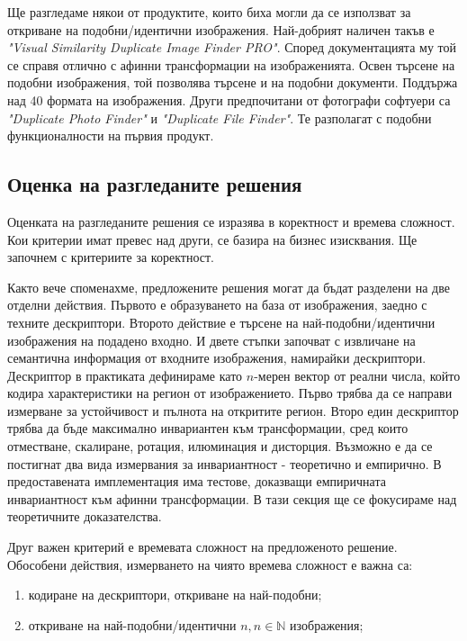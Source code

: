 \documentclass[a4paper,12pt]{article}
\begin{document}
\bigbreak

Ще разгледаме някои от продуктите, които биха могли да се използват за откриване на подобни/идентични изображения. Най-добрият наличен такъв е \textit{"Visual Similarity Duplicate Image Finder PRO"}. Според документацията му той се справя отлично с афинни трансформации на изображенията. Освен търсене на подобни изображения, той позволява търсене и на подобни документи. Поддържа над 40 формата на изображения. Други предпочитани от фотографи софтуери са \textit{"Duplicate Photo Finder"} и \textit{"Duplicate File Finder"}. Те разполагат с подобни функционалности на първия продукт.

\subsection{Оценка на разгледаните решения}

Оценката на разгледаните решения се изразява в коректност и времева сложност. Кои критерии имат превес над други, се базира на бизнес изисквания. Ще започнем с критериите за коректност.

\bigbreak

Както вече споменахме, предложените решения могат да бъдат разделени на две отделни действия. Първото е образуването на база от изображения, заедно с техните дескриптори. Второто действие е търсене на най-подобни/идентични изображения на подадено входно. И двете стъпки започват с извличане на семантична информация от входните изображения, намирайки дескриптори. Дескриптор в практиката дефинираме като $n$-мерен вектор от реални числа, който кодира характеристики на регион от изображението. Първо трябва да се направи измерване за устойчивост и пълнота на откритите регион. Второ един дескриптор трябва да бъде максимално инвариантен към трансформации, сред които отместване, скалиране, ротация, илюминация и дисторция. Възможно е да се постигнат два вида измервания за инвариантност - теоретично и емпирично. В предоставената имплементация има тестове, доказващи емпиричната инвариантност към афинни трансформации. В тази секция ще се фокусираме над теоретичните доказателства.

\bigbreak

Друг важен критерий е времевата сложност на предложеното решение. Обособени действия, измерването на чиято времева сложност е важна са:

\begin{enumerate}
    \item кодиране на дескриптори, откриване на най-подобни;
    \item откриване на най-подобни/идентични $n, n \in \mathbb{N}$ изображения;
\end{enumerate}
\end{document}
